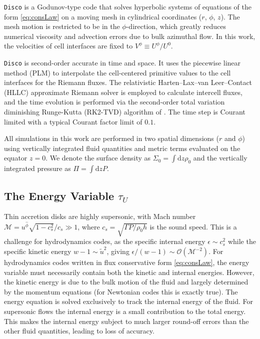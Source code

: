 \documentclass{emulateapj}
\newcommand{\eps}{\epsilon}
\newcommand{\Sig}{\Sigma}
\newcommand{\Mach}{\mathcal{M}}
\newcommand{\dd}{\mbox{d}}
\newcommand{\Disco}{{\texttt{Disco}}}
\newcommand{\OO}{\mathcal{O}}
\begin{document}
\Disco{} is a Godunov-type code that solves hyperbolic systems of equations of the form \eqref{eq:consLaw} on a moving mesh in cylindrical coordinates ($r$, $\phi$, $z$).  The mesh motion is restricted to be in the $\phi$-direction, which greatly reduces numerical viscosity and advection errors due to bulk azimuthal flow.  In this work, the velocities of cell interfaces are fixed to $V^\phi \equiv U^\phi/U^0$.   

\Disco{} is second-order accurate in time and space.  It uses the piecewise linear method (PLM) to interpolate the cell-centered primitive values to the cell interfaces for the Riemann fluxes.  The relativistic Harten--Lax--van Leer--Contact (HLLC) approximate Riemann solver \citep{Mignone05} is employed to calculate intercell fluxes, and the time evolution is performed via the second-order total variation diminishing Runge-Kutta (RK2-TVD) algorithm of \cite{Gottlieb98}.  The time step is Courant limited with a typical Courant factor limit of $0.1$.

All simulations in this work are performed in two spatial dimensions ($r$ and $\phi$) using vertically integrated fluid quantities and metric terms evaluated on the equator $z=0$.  We denote the surface density as $\Sig_0 = \int \dd z \rho_0$ and the vertically integrated pressure as $\Pi = \int \dd z P$.  


\subsection{The Energy Variable $\tau_U$}
\label{subsec:energy}


Thin accretion disks are highly supersonic, with Mach number $\Mach = u^{\hat{\phi}} \sqrt{1-c_s^2}/c_s \gg 1$, where $c_s = \sqrt{\Gamma P / \rho_0 h}$ is the sound speed.  This is a challenge for hydrodynamics codes, as the specific internal energy $\eps \sim c_s^2$ while the specific kinetic energy $w-1 \sim \tilde{u}^2$, giving $\eps / (w-1) \sim \OO(\Mach^{-2})$.  For hydrodynamics codes written in flux conservative form \eqref{eq:consLaw}, the energy variable must necessarily contain both the kinetic and internal energies.  However, the kinetic energy is due to the bulk motion of the fluid and largely determined by the momentum equations (for Newtonian codes this is exactly true).  The energy equation is solved exclusively to track the internal energy of the fluid. For supersonic flows the internal energy is a small contribution to the total energy.  This makes the internal energy subject to much larger round-off errors than the other fluid quantities, leading to loss of accuracy.
\end{document}
